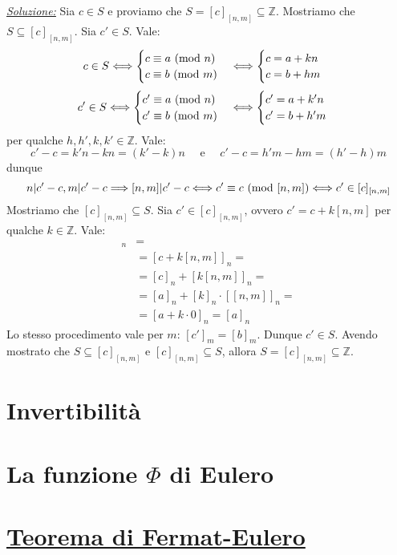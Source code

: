 \begin{tcolorbox}[enhanced, breakable, title={Teolema cinese del lesto}]
\underline{\emph{Soluzione:}} Sia $c \in S$ e proviamo che $S=[c]_{[n,m]} \subseteq \mathbb{Z}$.
Mostriamo che $S \subseteq [c]_{[n,m]}$. Sia $c'\in S$. Vale:
\[ c \in S \Longleftrightarrow
    \begin{cases}
        c \equiv a \ (\mathrm{mod}\ n)\\
        c \equiv b \ (\mathrm{mod}\ m)
    \end{cases}
    \Longleftrightarrow
    \begin{cases}
        c = a+kn\\
        c = b+hm
    \end{cases}
\]
\[
    c' \in S \Longleftrightarrow
    \begin{cases}
        c' \equiv a \ (\mathrm{mod}\ n)\\
        c' \equiv b \ (\mathrm{mod}\ m)
    \end{cases}
    \Longleftrightarrow
    \begin{cases}
        c' = a+k'n\\
        c' = b+h'm
    \end{cases}
\]
per qualche $h,h',k,k' \in \mathbb{Z}$. Vale:
\[ c'-c=k'n-kn=(k'-k)n \quad\text{ e }\quad c'-c=h'm-hm=(h'-h)m \]
dunque
\[ n|c'-c,m|c'-c \Longrightarrow [n,m]|c'-c \Longleftrightarrow c'\equiv c \ (\mathrm{mod}\ [n,m]) \Longleftrightarrow c' \in [c]_{[n,m]} \]
Mostriamo che $[c]_{[n,m]} \subseteq S$. Sia $c' \in [c]_{[n,m]}$, ovvero $c'=c+k[n,m]$ per qualche
$k \in \mathbb{Z}$. Vale:
\begin{align*}
    [c']_n &=\\
    &= [c+k[n,m]]_n =\\
    &= [c]_n + [k[n,m]]_n =\\
    &= [a]_n + [k]_n \cdot [[n,m]]_n =\\
    &= [a+k\cdot 0]_n = [a]_n
\end{align*}
Lo stesso procedimento vale per $m$: $[c']_m = [b]_m$. Dunque $c'\in S$.
Avendo mostrato che $S\subseteq[c]_{[n,m]}$ e $[c]_{[n,m]}\subseteq S$,
allora $S = [c]_{[n,m]}\subseteq\mathbb{Z}$.
\cvd
\end{tcolorbox}

\section{Invertibilità}
\section{La funzione $\Phi$ di Eulero}
\section{\underline{Teorema di Fermat-Eulero}}
